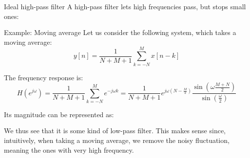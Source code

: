 \documentclass[a4paper]{article}
\begin{document}
\begin{parag}{Ideal high-pass filter}
    A high-pass filter lets high frequencies pass, but stops small ones:
\end{parag}

\begin{parag}{Example: Moving average}
    Let us consider the following system, which takes a moving average: 
    \[y\left[n\right] = \frac{1}{N + M + 1} \sum_{k=-N}^{M} x\left[n-k\right]\]
    
    The frequency response is: 
    \[H\left(e^{j\omega}\right) = \frac{1}{N+M+1} \sum_{k=-N}^{M} e^{-j \omega k} = \frac{1}{N+M+1} e^{j\omega\left(N - \frac{M}{2}\right)} \frac{\sin\left(\omega \frac{M+N}{2}\right)}{\sin\left(\frac{\omega}{2}\right)}\]
    
    Its magnitude can be represented as:

    We thus see that it is some kind of low-pass filter. This makes sense since, intuitively, when taking a moving average, we remove the noisy fluctuation, meaning the ones with very high frequency.
\end{parag}
\end{document}
